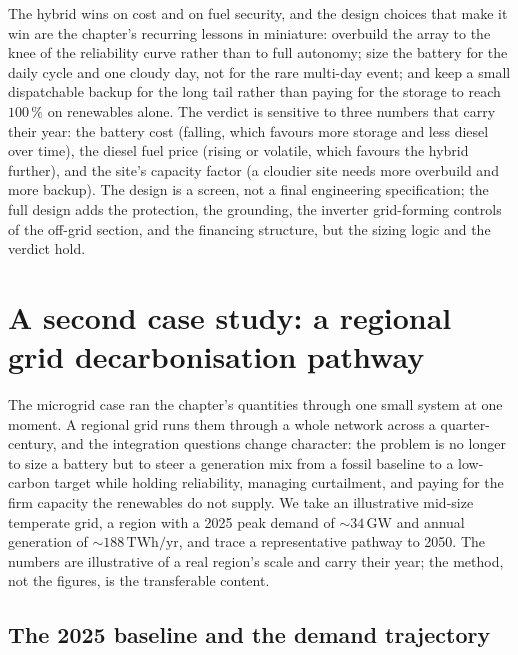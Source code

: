 The hybrid wins on cost and on fuel security, and the design choices that
make it win are the chapter's recurring lessons in miniature: overbuild
the array to the knee of the reliability curve rather than to full
autonomy; size the battery for the daily cycle and one cloudy day, not for
the rare multi-day event; and keep a small dispatchable backup for the
long tail rather than paying for the storage to reach $100\,\%$ on
renewables alone. The verdict is sensitive to three numbers that carry
their year: the battery cost (falling, which favours more storage and less
diesel over time), the diesel fuel price (rising or volatile, which
favours the hybrid further), and the site's capacity factor (a cloudier
site needs more overbuild and more backup). The design is a screen, not a
final engineering specification; the full design adds the protection,
the grounding, the inverter grid-forming controls of the off-grid section,
and the financing structure, but the sizing logic and the verdict hold.

\section{A second case study: a regional grid decarbonisation pathway}

The microgrid case ran the chapter's quantities through one small system at
one moment. A regional grid runs them through a whole network across a
quarter-century, and the integration questions change character: the
problem is no longer to size a battery but to steer a generation mix from a
fossil baseline to a low-carbon target while holding reliability, managing
curtailment, and paying for the firm capacity the renewables do not supply.
We take an illustrative mid-size temperate grid, a region with a 2025 peak
demand of $\sim 34\,\si{\giga\watt}$ and annual generation of $\sim
188\,\text{TWh}/\text{yr}$, and trace a representative pathway to 2050. The
numbers are illustrative of a real region's scale and carry their year; the
method, not the figures, is the transferable content.

\subsection{The 2025 baseline and the demand trajectory}


